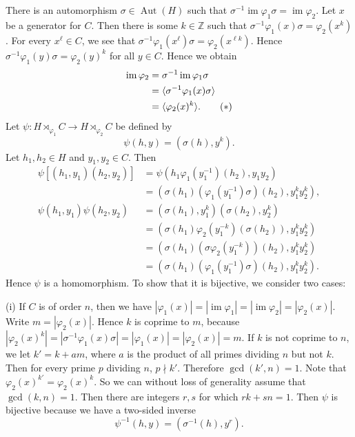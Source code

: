 \begin{sketch}
 	There is an automorphism $\sigma\in \operatorname{Aut}(H)$ such that $\sigma^{-1} \operatorname{im} \varphi_1 \sigma = \operatorname{im} \varphi_2$. Let $x$ be a generator for $C$. Then there is some $k\in\mathbb{Z}$ such that $\sigma^{-1} \varphi_1(x) \sigma =  \varphi_2(x^k)$. For every $x^\ell\in C$, we see that $ \sigma^{-1} \varphi_1(x^\ell) \sigma = \varphi_2(x^{\ell k}) $. Hence $\sigma^{-1} \varphi_1(y) \sigma =  \varphi_2(y)^k$ for all $y\in C$. Hence we obtain
 	\begin{align}
 		\operatorname{im}\varphi_2 &= \sigma^{-1}\operatorname{im}\varphi_1 \sigma \notag
 		\\
 		&= \langle \sigma^{-1}\varphi_1(x) \sigma \rangle \notag
 		\\
 		&= \langle \varphi_2(x)^k\rangle. \tag{$*$} \label{eq-prop-8.16}
 	\end{align}  Let $\psi: H\rtimes_{\varphi_1} C \rightarrow H\rtimes_{\varphi_2} C$ be defined by 
 	\begin{equation*}
 		\psi(h,y) = (\sigma(h),y^k).
 	\end{equation*}
 	Let $h_1,h_2\in H$ and $y_1,y_2\in C$. Then
 	\begin{align*}
 	\psi[(h_1,y_1)(h_2,y_2)] &= \psi(h_1 \varphi_1(y_1^{-1})(h_2), y_1y_2)
 	\\
 	&= \left(\sigma(h_1) (\varphi_1(y_1^{-1})\sigma)(h_2), y_1^ky_2^k\right),
 	\\
 	\psi(h_1,y_1)\psi(h_2,y_2) &= \left(\sigma(h_1),y_1^k\right)\left(\sigma(h_2),y_2^k\right)
 	\\
 	&= \left(\sigma(h_1)\varphi_2(y_1^{-k})(\sigma(h_2)),y_1^ky_2^k\right)
 	\\
 	&= \left(\sigma(h_1)( \sigma\varphi_2(y_1^{-k}))(h_2),y_1^ky_2^k\right)
 	\\
 	&= \left(\sigma(h_1)(\varphi_1(y_1^{-1})\sigma )(h_2),y_1^ky_2^k\right).
 	\end{align*}
 Hence $\psi$ is a homomorphism.  To show that it is bijective, we consider two cases:
 	
 	(i) If $C$ is of order $n$, then we have $|\varphi_1(x)| = |\operatorname{im}\varphi_1| = |\operatorname{im}\varphi_2|= |\varphi_2(x)|$. Write $m = |\varphi_2(x)|$.  Hence $k$ is coprime to $m$, because $|\varphi_2(x)^k| = |\sigma^{-1}\varphi_1(x)\sigma| = |\varphi_1(x)| = |\varphi_2(x)| = m$. If $k$ is not coprime to $n$, we let $k' = k + am$, where $a$ is the product of all primes dividing $n$ but not $k$. Then for every prime $p$ dividing $n$, $p\nmid k'$. Therefore $\gcd(k',n) = 1$. Note that $\varphi_2(x)^{k'} = \varphi_2(x)^k$. So we can without loss of generality assume that $\gcd(k,n)=1$.  Then there are integers $r,s$ for which $rk+sn = 1$. Then $\psi$ is bijective because we have a two-sided inverse 
 	\begin{equation*}
 		\psi^{-1}(h,y) = (\sigma^{-1}(h),y^r).
 	\end{equation*}
 	

\end{sketch}
